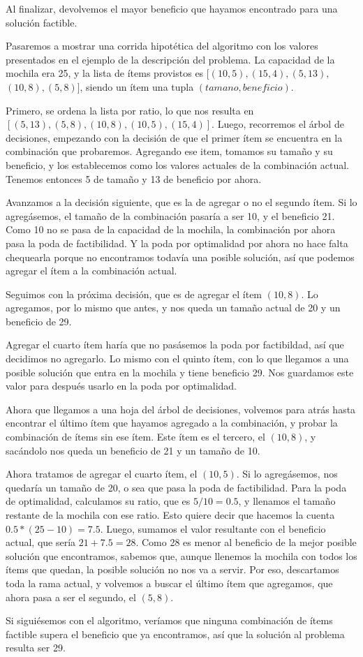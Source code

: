 \documentclass[10pt, a4paper]{article}
\begin{document}
Al finalizar, devolvemos el mayor beneficio que hayamos encontrado para una solución factible.\par
Pasaremos a mostrar una corrida hipotética del algoritmo con los valores presentados en el ejemplo de la descripción del problema. La capacidad de la mochila era 25, y la lista de ítems provistos es $[(10, 5), (15, 4), (5, 13),$ $(10, 8), (5, 8)]$, siendo un ítem una tupla $(tamano, beneficio)$.\par
Primero, se ordena la lista por ratio, lo que nos resulta en $[(5, 13), (5, 8), (10, 8), (10, 5), (15, 4)]$. Luego, recorremos el árbol de decisiones, empezando con la decisión de que el primer ítem se encuentra en la combinación que probaremos. Agregando ese item, tomamos su tamaño y su beneficio, y los establecemos como los valores actuales de la combinación actual. Tenemos entonces 5 de tamaño y 13 de beneficio por ahora.\par
Avanzamos a la decisión siguiente, que es la de agregar o no el segundo ítem. Si lo agregásemos, el tamaño de la combinación pasaría a ser 10, y el beneficio 21. Como 10 no se pasa de la capacidad de la mochila, la combinación por ahora pasa la poda de factibilidad. Y la poda por optimalidad por ahora no hace falta chequearla porque no encontramos todavía una posible solución, así que podemos agregar el ítem a la combinación actual.\par
Seguimos con la próxima decisión, que es de agregar el ítem $(10, 8)$. Lo agregamos, por lo mismo que antes, y nos queda un tamaño actual de 20 y un beneficio de 29.\par
Agregar el cuarto ítem haría que no pasásemos la poda por factibildad, así que decidimos no agregarlo. Lo mismo con el quinto ítem, con lo que llegamos a una posible solución que entra en la mochila y tiene beneficio 29. Nos guardamos este valor para después usarlo en la poda por optimalidad.\par
Ahora que llegamos a una hoja del árbol de decisiones, volvemos para atrás hasta encontrar el último ítem que hayamos agregado a la combinación, y probar la combinación de ítems sin ese ítem. Este ítem es el tercero, el $(10, 8)$, y sacándolo nos queda un beneficio de 21 y un tamaño de 10.\par
Ahora tratamos de agregar el cuarto ítem, el $(10, 5)$. Si lo agregásemos, nos quedaría un tamaño de 20, o sea que pasa la poda de factibilidad. Para la poda de optimalidad, calculamos su ratio, que es $5 / 10 = 0.5$, y llenamos el tamaño restante de la mochila con ese ratio. Esto quiere decir que hacemos la cuenta $0.5 * (25 - 10) = 7.5$. Luego, sumamos el valor resultante con el beneficio actual, que sería $21 + 7.5 = 28$. Como 28 es menor al beneficio de la mejor posible solución que encontramos, sabemos que, aunque llenemos la mochila con todos los ítems que quedan, la posible solución no nos va a servir. Por eso, descartamos toda la rama actual, y volvemos a buscar el último ítem que agregamos, que ahora pasa a ser el segundo, el $(5, 8)$.\par
Si siguiésemos con el algoritmo, veríamos que ninguna combinación de ítems factible supera el beneficio que ya encontramos, así que la solución al problema resulta ser 29.\par
\end{document}
